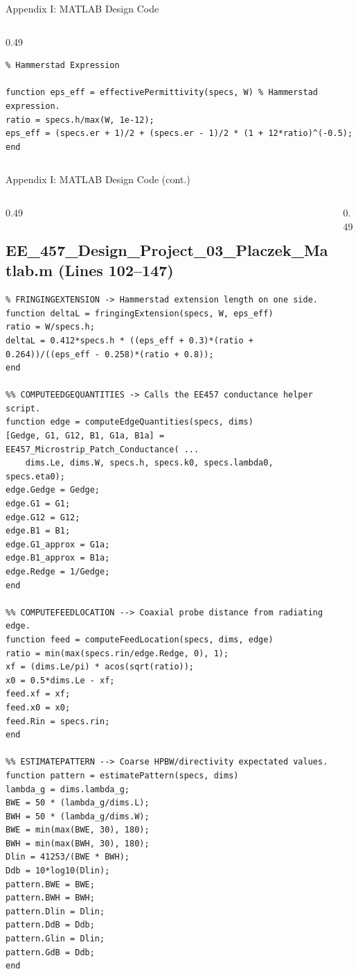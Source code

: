 \documentclass[compress,aspectratio=169,10pt]{beamer}
\begin{document}
\begin{frame}[fragile]{Appendix I: MATLAB Design Code}
\begin{columns}[T]
\begin{column}{0.49\textwidth}
\begin{lstlisting}[firstnumber=48]
%%-------------------------------------------------------------------------
% Hammerstad Expression

function eps_eff = effectivePermittivity(specs, W) % Hammerstad expression.
ratio = specs.h/max(W, 1e-12);
eps_eff = (specs.er + 1)/2 + (specs.er - 1)/2 * (1 + 12*ratio)^(-0.5);
end
            \end{lstlisting}
        \end{column}
    \end{columns}
\end{frame}

\begin{frame}[fragile]{Appendix I: MATLAB Design Code (cont.)}
    \begin{columns}[T]
        \begin{column}{0.49\textwidth}
\subsection[Design code 3]{EE\_457\_Design\_Project\_03\_Placzek\_Matlab.m (Lines 102--147)}
            \begin{lstlisting}[firstnumber=102]
%%-------------------------------------------------------------------------
% FRINGINGEXTENSION -> Hammerstad extension length on one side.
function deltaL = fringingExtension(specs, W, eps_eff)
ratio = W/specs.h;
deltaL = 0.412*specs.h * ((eps_eff + 0.3)*(ratio + 0.264))/((eps_eff - 0.258)*(ratio + 0.8));
end

%% COMPUTEEDGEQUANTITIES -> Calls the EE457 conductance helper script.
function edge = computeEdgeQuantities(specs, dims)
[Gedge, G1, G12, B1, G1a, B1a] = EE457_Microstrip_Patch_Conductance( ...
    dims.Le, dims.W, specs.h, specs.k0, specs.lambda0, specs.eta0);
edge.Gedge = Gedge;
edge.G1 = G1;
edge.G12 = G12;
edge.B1 = B1;
edge.G1_approx = G1a;
edge.B1_approx = B1a;
edge.Redge = 1/Gedge;
end

%% COMPUTEFEEDLOCATION --> Coaxial probe distance from radiating edge.
function feed = computeFeedLocation(specs, dims, edge)
ratio = min(max(specs.rin/edge.Redge, 0), 1);
xf = (dims.Le/pi) * acos(sqrt(ratio));
x0 = 0.5*dims.Le - xf;
feed.xf = xf;
feed.x0 = x0;
feed.Rin = specs.rin;
end

%% ESTIMATEPATTERN --> Coarse HPBW/directivity expectated values.
function pattern = estimatePattern(specs, dims)
lambda_g = dims.lambda_g;
BWE = 50 * (lambda_g/dims.L);
BWH = 50 * (lambda_g/dims.W);
BWE = min(max(BWE, 30), 180);
BWH = min(max(BWH, 30), 180);
Dlin = 41253/(BWE * BWH);
Ddb = 10*log10(Dlin);
pattern.BWE = BWE;
pattern.BWH = BWH;
pattern.Dlin = Dlin;
pattern.DdB = Ddb;
pattern.Glin = Dlin;
pattern.GdB = Ddb;
end
            \end{lstlisting}
        \end{column}
        \begin{column}{0.49\textwidth}

\end{column}
\end{columns}
\end{frame}
\end{document}
